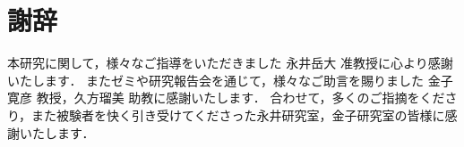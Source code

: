 \chapter*{謝辞}

    本研究に関して，様々なご指導をいただきました 永井岳大 准教授に心より感謝いたします．
    またゼミや研究報告会を通じて，様々なご助言を賜りました 金子寛彦 教授，久方瑠美 助教に感謝いたします．
    合わせて，多くのご指摘をくださり，また被験者を快く引き受けてくださった永井研究室，金子研究室の皆様に感謝いたします．